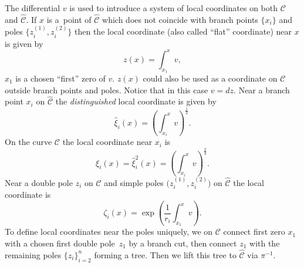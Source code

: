 \documentclass[pdftex]{sigma}
\numberwithin{equation}{section}
\theoremstyle{definition}
\begin{document}
The differential $v$ is used to introduce
a system of local coordinates on both $\mathcal{C}$ and $\hat{\mathcal{C}}.$ If $x$ is a~point of $\hat{\mathcal{C}}$ which does not coincide with branch points $\{x_i\}$ and poles $\big\{ z^{(1)}_i, z^{(2)}_i \big\}$ then the local coordinate (also called ``flat'' coordinate) near $x$ is given by
\begin{equation}\label{36}
z(x)=\int^x_{x_1}v,
\end{equation}
$x_1$ is a chosen ``first'' zero of $v.$ $z(x)$ could also be used as a coordinate on $\mathcal{C}$ outside branch points and poles. Notice that in this case $v=dz.$ Near a branch point $x_i$ on $\hat{\mathcal{C}}$ the \textit{distinguished} local coordinate is given by
\begin{equation}\label{37}
\hat{\xi}_i(x)=\left(\int^x_{x_i}v\right)^{\frac{1}{3}}.
\end{equation}
On the curve $\mathcal{C}$ the local coordinate near $x_i$ is
\begin{equation}\label{38}{\xi}_i(x)=\hat{\xi}^2_i(x)=\left(\int^x_{x_i}v\right)^{\frac{2}{3}}. \end{equation}
Near a double pole $z_i$ on $\mathcal{C}$ and simple poles $\big(z^{(1)}_i, z^{(2)}_i\big)$ on $\hat{\mathcal{C}}$ the local coordinate is
\begin{equation}\label{39}\zeta_i(x)=\exp \left(\frac{1}{ r_i} \int^x_{x_1}v\right). \end{equation}
To define local coordinates near the poles uniquely, we on $\mathcal{C}$ connect first zero $x_1$ with a chosen first double pole~$z_1$ by a branch cut, then connect $z_1$ with the remaining poles $\{z_i\}^n_{i=2}$ forming a tree. Then we lift this tree to $\hat{\mathcal{C}}$ via $\pi^{-1}.$
\end{document}
